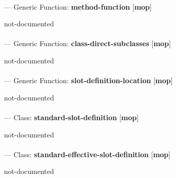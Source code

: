 \paragraph{}
\label{MOP:METHOD-FUNCTION}
--- Generic Function: \textbf{method-function} [\textbf{mop}] \textit{}

\begin{adjustwidth}{5em}{5em}
not-documented
\end{adjustwidth}

\paragraph{}
\label{MOP:CLASS-DIRECT-SUBCLASSES}
--- Generic Function: \textbf{class-direct-subclasses} [\textbf{mop}] \textit{}

\begin{adjustwidth}{5em}{5em}
not-documented
\end{adjustwidth}

\paragraph{}
\label{MOP:SLOT-DEFINITION-LOCATION}
--- Generic Function: \textbf{slot-definition-location} [\textbf{mop}] \textit{}

\begin{adjustwidth}{5em}{5em}
not-documented
\end{adjustwidth}

\paragraph{}
\label{MOP:STANDARD-SLOT-DEFINITION}
--- Class: \textbf{standard-slot-definition} [\textbf{mop}] \textit{}

\begin{adjustwidth}{5em}{5em}
not-documented
\end{adjustwidth}

\paragraph{}
\label{MOP:STANDARD-EFFECTIVE-SLOT-DEFINITION}
--- Class: \textbf{standard-effective-slot-definition} [\textbf{mop}] \textit{}

\begin{adjustwidth}{5em}{5em}
not-documented
\end{adjustwidth}

